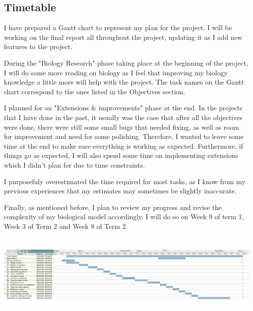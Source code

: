 \documentclass{article}
\begin{document}
	\subsection{Timetable}
	
	\par I have prepared a Gantt chart to represent my plan for the project. I will be working on the final report all throughout the project, updating it as I add new features to the project. 
	
	\par During the "Biology Research" phase taking place at the beginning of the project, I will do some more reading on biology as I feel that improving my biology knowledge a little more will help with the project. The task names on the Gantt chart correspond to the ones listed in the Objectives section. 
	
	\par I planned for an "Extensions \& improvements" phase at the end. In the projects that I have done in the past, it usually was the case that after all the objectives were done, there were still some small bugs that needed fixing, as well as room for improvement and need for some polishing. Therefore, I wanted to leave some time at the end to make sure everything is working as expected. Furthermore, if things go as expected, I will also spend some time on implementing extensions which I didn't plan for due to time constraints.
	
	\par I purposefuly overestimated the time required for most tasks, as I know from my previous experiences that my estimates may sometimes be slightly inaccurate.
	
	\par Finally, as mentioned before, I plan to review my progress and revise the complexity of my biological model accordingly. I will do so on Week 9 of term 1, Week 3 of Term 2 and Week 8 of Term 2.
	
	\includegraphics[height=120pt]{timetable}
	
\end{document}
